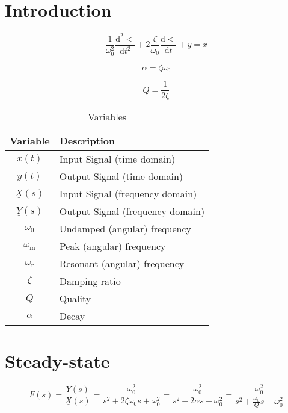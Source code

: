 \documentclass{article}[11pt]
\begin{document}
\notetitle

\section{Introduction}

\begin{equation}
\frac{1}{\omega_0^2} \frac{\mathrm{d}^2<}{\mathrm{d}t^2} + 2\frac{\zeta}{\omega_0}\frac{\mathrm{d}<}{\mathrm{d}t} + y = x
\end{equation}

\begin{equation}
\alpha = \zeta \omega_0
\end{equation}

\begin{equation}
Q =\frac{1}{2\zeta}
\end{equation}

\begin{table}[H]
\centering
\caption{Variables}
\begin{tabular}{cl}
\toprule
Variable              & Description                        \\ \midrule
$x(t)$                & Input Signal (time domain)         \\ 
$y(t)$                & Output Signal (time domain)        \\ 
$\underline{X}(s)$    & Input Signal (frequency domain)    \\ 
$\underline{Y}(s)$    & Output Signal (frequency domain)   \\
$\omega_0$            & Undamped (angular) frequency       \\
$\omega_{\mathrm{m}}$ & Peak (angular) frequency           \\
$\omega_{\mathrm{r}}$ & Resonant (angular) frequency       \\
$\zeta$               & Damping ratio                      \\
$Q$                   & Quality                            \\
$\alpha$              & Decay                              \\ \toprule
\end{tabular}
\label{tab:variables}
\end{table}

\section{Steady-state}

\begin{equation}
\underline{F}(s) = \frac{\underline{Y}(s)}{\underline{X}(s)} 
                 = \frac{\omega_0^2}{s^2 + 2 \zeta \omega_0 s + \omega_0^2 }
                 = \frac{\omega_0^2}{s^2 + 2 \alpha s + \omega_0^2 }
                 = \frac{\omega_0^2}{s^2 + \frac{\omega_0}{Q} s + \omega_0^2 }
\end{equation}
\end{document}
